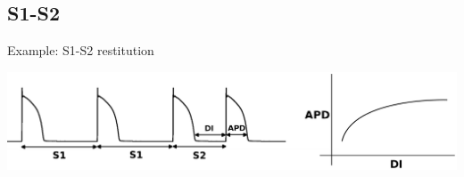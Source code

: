 \documentclass[t,xcolor={usenames,dvipsnames}]{beamer}
\begin{document}
\subsection*{S1-S2}

\begin{frame}{Example: S1-S2 restitution}
\begin{center}
\includegraphics[width=\textwidth]{S1S2}
\end{center}
\end{frame}
\end{document}
